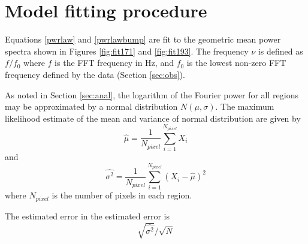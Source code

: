 \documentclass[preprint]{../aastex52/aastex}
\begin{document}

\appendix

\section{Model fitting procedure}\label{sec:app:ind}
Equations \ref{pwrlaw} and \ref{pwrlawbump} are fit to the geometric
mean power spectra shown in Figures \ref{fig:fit171} and
\ref{fig:fit193}.  The frequency $\nu$ is defined as $f/f_{0}$ where
$f$ is the FFT frequency in Hz, and $f_{0}$ is the lowest non-zero FFT
frequency defined by the data (Section \ref{sec:obs}).

As noted in Section \ref{sec:anal}, the logarithm of the Fourier power for all
regions may be approximated by a normal distribution $N(\mu, \sigma)$.
The maximum likelihood estimate of the mean and variance of normal
distribution are given by
\begin{equation}
\hat{\mu} = \frac{1}{N_{pixel}}\sum_{i=1}^{N_{pixel}}X_{i}
\label{eqn:mlmean}
\end{equation}
and
\begin{equation}
\hat{\sigma^{2}} = \frac{1}{N_{pixel}}\sum_{i=1}^{N_{pixel}}(X_{i}-\hat{\mu})^{2}
\label{eqn:mlmean}
\end{equation}
where $N_{pixel}$ is the number of pixels in each region.



The estimated
error in the estimated error is
\begin{equation}
\sqrt{\hat{\sigma^{2}}}/\sqrt{N}
\label{eqn:mlmean}
\end{equation}






\end{document}
